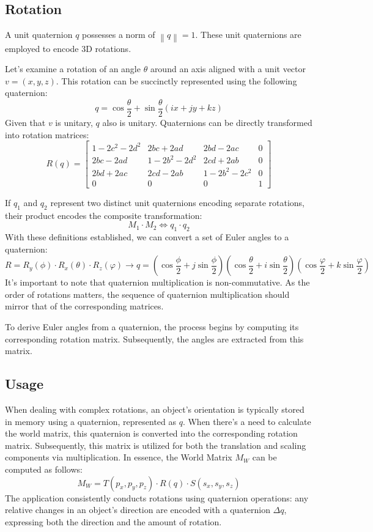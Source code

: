 \subsection{Rotation}
A unit quaternion $q$ possesses a norm of $\left\lVert q \right\rVert = 1$. 
These unit quaternions are employed to encode 3D rotations.

Let's examine a rotation of an angle $\theta$ around an axis aligned with a unit vector $v = (x,y,z)$. 
This rotation can be succinctly represented using the following quaternion:
\[q=\cos\dfrac{\theta}{2}+\sin\dfrac{\theta}{2}(ix+jy+kz)\]
Given that $v$ is unitary, $q$ also is unitary.
Quaternions can be directly transformed into rotation matrices: 
\[R(q)=\begin{bmatrix}
    1-2c^2-2d^2 & 2bc+2ad & 2bd-2ac & 0 \\
    2bc-2ad & 1-2b^2-2d^2 & 2cd+2ab & 0 \\
    2bd+2ac & 2cd-2ab & 1-2b^2-2c^2 & 0 \\
    0 & 0 & 0 & 1
\end{bmatrix}\]

If $q_1$ and $q_2$ represent two distinct unit quaternions encoding separate rotations, their product encodes the composite transformation:
\[M_1\cdot M_2 \Leftrightarrow q_1\cdot q_2\]
With these definitions established, we can convert a set of Euler angles to a quaternion:
\[R=R_y(\phi)\cdot R_x(\theta)\cdot R_z(\varphi) \rightarrow q=\left(\cos\dfrac{\phi}{2}+j\sin\dfrac{\phi}{2}\right)\left(\cos\dfrac{\theta}{2}+i\sin\dfrac{\theta}{2}\right)\left(\cos\dfrac{\varphi}{2}+k\sin\dfrac{\varphi}{2}\right)\]
It's important to note that quaternion multiplication is non-commutative.
As the order of rotations matters, the sequence of quaternion multiplication should mirror that of the corresponding matrices.

To derive Euler angles from a quaternion, the process begins by computing its corresponding rotation matrix. 
Subsequently, the angles are extracted from this matrix.

\subsection{Usage}
When dealing with complex rotations, an object's orientation is typically stored in memory using a quaternion, represented as $q$.
When there's a need to calculate the world matrix, this quaternion is converted into the corresponding rotation matrix.
Subsequently, this matrix is utilized for both the translation and scaling components via multiplication.
In essence, the World Matrix $M_W$ can be computed as follows:
\[M_W = T(p_x, p_y, p_z) \cdot R(q) \cdot S(s_x, s_y, s_z)\]
The application consistently conducts rotations using quaternion operations: any relative changes in an object's direction are encoded with a quaternion $\Delta q$, expressing both the direction and the amount of rotation.

